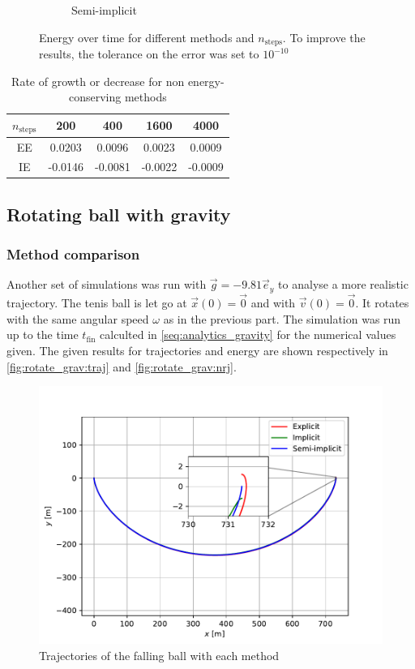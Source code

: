 \begin{figure}[h]
\begin{subfigure}{0.5\linewidth}
        \caption{Semi-implicit}
    \end{subfigure}
    \caption{Energy over time for different methods and $n_\textrm{steps}$. To improve the results, the tolerance on the error was set to $10^{-10}$}
    \label{fig:nograv:energy}
\end{figure}

\begin{table}[h]
    \centering
    \begin{tabulary}{0.8\linewidth}{C|C|C|C|C}
        \toprule
        $n_\textrm{steps}$ & 200 & 400 & 1600 & 4000 \\
        \midrule
        EE & 0.0203 & 0.0096 & 0.0023 & 0.0009 \\
        IE & -0.0146 & -0.0081 & -0.0022 & -0.0009 \\
        \bottomrule
    \end{tabulary}
    \caption{Rate of growth or decrease for non energy-conserving methods}
    \label{tab:nograv:rate}
\end{table}

\subsection{Rotating ball with gravity}
\subsubsection{Method comparison}
\label{seq:gravrot:comp}


Another set of simulations was run with $\vec{g} = -9.81 \vec{e}_y$ to analyse a more realistic trajectory. The tenis ball is let go at $\vec{x}(0) = \vec{0}$ and with $\vec{v}(0) = \vec{0}$. It rotates with the same angular speed $\omega$ as in the previous part. The simulation was run up to the time $t_\mathrm{fin}$ calculted in \autoref{seq:analytics_gravity} for the numerical values given. The given results for trajectories and energy are shown respectively in \autoref{fig:rotate_grav:traj} and \autoref{fig:rotate_grav:nrj}.

\begin{figure}[h]
    \centering
    \includegraphics[width=0.7\linewidth]{figures/rotate_grav_trajectories.pdf}
    \caption{Trajectories of the falling ball with each method}
    \label{fig:rotate_grav:traj}
\end{figure}

